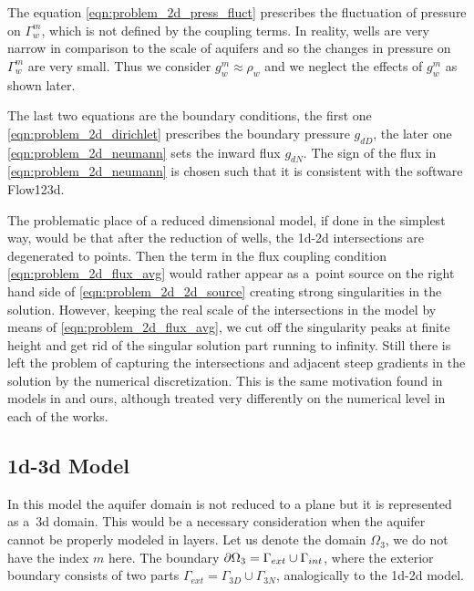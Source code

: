 The equation \eqref{eqn:problem_2d_press_fluct} prescribes the fluctuation of pressure on $\Gamma^m_w$,
which is not defined by the coupling terms. In reality, wells are very narrow in comparison to the scale of aquifers
and so the changes in pressure on $\Gamma^m_w$ are very small. Thus we consider $g^m_w \approx \rho_w$ and
we neglect the effects of $g^m_w$ as shown later.


The last two equations are the boundary conditions, the first one \eqref{eqn:problem_2d_dirichlet} prescribes the boundary pressure $g_{dD}$, 
the later one \eqref{eqn:problem_2d_neumann} sets the inward flux $g_{dN}$. The sign of the flux in \eqref{eqn:problem_2d_neumann}
is chosen such that it is consistent with the software Flow123d.

The problematic place of a reduced dimensional model, if done in the simplest way, would be that after the reduction of wells,
the 1d-2d intersections are degenerated to points. Then the term in the flux coupling condition \eqref{eqn:problem_2d_flux_avg} would rather
appear as a~point source on the right hand side of \eqref{eqn:problem_2d_2d_source} creating strong singularities in the solution.
However, keeping the real scale of the intersections in the model by means of \eqref{eqn:problem_2d_flux_avg}, we cut off the singularity peaks
at finite height and get rid of the singular solution part running to infinity.
Still there is left the problem of capturing the intersections and adjacent steep gradients in the solution by the numerical discretization.
This is the same motivation found in models in \cite{gracie_modelling_2010,craig_using_2011,koppl_vidotto_2018} and ours,
although treated very differently on the numerical level in each of the works.

\subsection{1d-3d Model}
In this model the aquifer domain is not reduced to a plane but it is represented as a~3d domain.
This would be a necessary consideration when the aquifer cannot be properly modeled in layers.
Let us denote the domain $\Omega_3$, we do not have the index $m$ here.
The boundary $\partial\Omega_3 = \Gamma_{ext} \cup \Gamma_{int}$,
where the exterior boundary consists of two parts $\Gamma_{ext} = \Gamma_{3D} \cup \Gamma_{3N}$,
analogically to the 1d-2d model.

